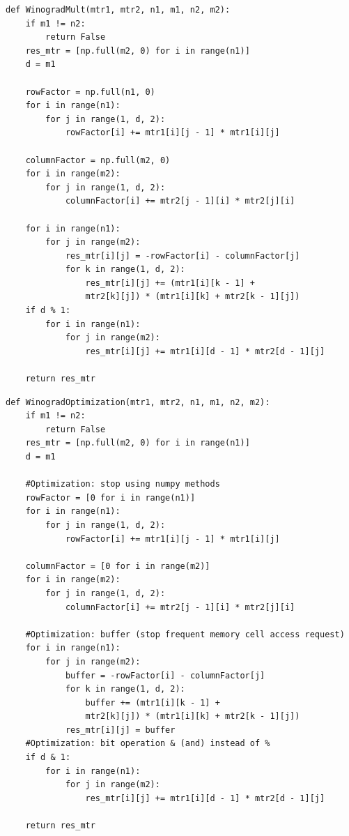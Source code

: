 \documentclass[12pt]{report}
\begin{document}
\begin{lstlisting}[label=some-code,caption=Подпрограмма алгоритма Винограда]
def WinogradMult(mtr1, mtr2, n1, m1, n2, m2):
    if m1 != n2:
        return False
    res_mtr = [np.full(m2, 0) for i in range(n1)]
    d = m1

    rowFactor = np.full(n1, 0)
    for i in range(n1):
        for j in range(1, d, 2):
            rowFactor[i] += mtr1[i][j - 1] * mtr1[i][j]

    columnFactor = np.full(m2, 0)
    for i in range(m2):
        for j in range(1, d, 2):
            columnFactor[i] += mtr2[j - 1][i] * mtr2[j][i]

    for i in range(n1):
        for j in range(m2):
            res_mtr[i][j] = -rowFactor[i] - columnFactor[j]
            for k in range(1, d, 2):
                res_mtr[i][j] += (mtr1[i][k - 1] +
                mtr2[k][j]) * (mtr1[i][k] + mtr2[k - 1][j])
    if d % 1:
        for i in range(n1):
            for j in range(m2):
                res_mtr[i][j] += mtr1[i][d - 1] * mtr2[d - 1][j]

    return res_mtr\end{lstlisting}

\begin{lstlisting}[label=some-code,caption=Подпрограмма алгоритма Винограда с оптимизациями]
def WinogradOptimization(mtr1, mtr2, n1, m1, n2, m2):
    if m1 != n2:
        return False
    res_mtr = [np.full(m2, 0) for i in range(n1)]
    d = m1
    
    #Optimization: stop using numpy methods
    rowFactor = [0 for i in range(n1)]
    for i in range(n1):
        for j in range(1, d, 2):
            rowFactor[i] += mtr1[i][j - 1] * mtr1[i][j]

    columnFactor = [0 for i in range(m2)]
    for i in range(m2):
        for j in range(1, d, 2):
            columnFactor[i] += mtr2[j - 1][i] * mtr2[j][i]

    #Optimization: buffer (stop frequent memory cell access request)
    for i in range(n1):
        for j in range(m2):
            buffer = -rowFactor[i] - columnFactor[j]
            for k in range(1, d, 2):
                buffer += (mtr1[i][k - 1] +
                mtr2[k][j]) * (mtr1[i][k] + mtr2[k - 1][j])
            res_mtr[i][j] = buffer
    #Optimization: bit operation & (and) instead of %
    if d & 1:
        for i in range(n1):
            for j in range(m2):
                res_mtr[i][j] += mtr1[i][d - 1] * mtr2[d - 1][j]

    return res_mtr
\end{lstlisting}
\end{document}
